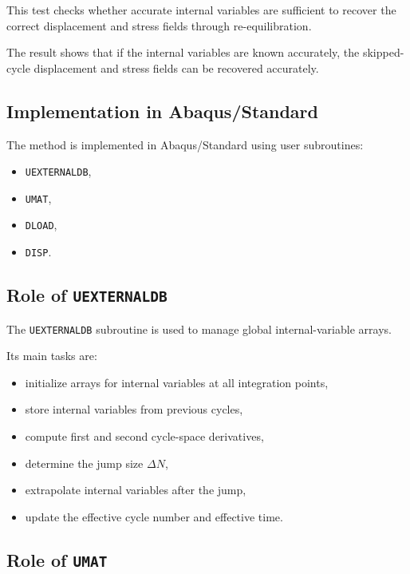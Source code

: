 ﻿\documentclass[11pt,a4paper]{article}
\begin{document}
This test checks whether accurate internal variables are sufficient to recover the correct displacement and stress fields through re-equilibration.

The result shows that if the internal variables are known accurately, the skipped-cycle displacement and stress fields can be recovered accurately.

\subsection{Implementation in Abaqus/Standard}

The method is implemented in Abaqus/Standard using user subroutines:

\begin{itemize}[leftmargin=*]
    \item \texttt{UEXTERNALDB},
    \item \texttt{UMAT},
    \item \texttt{DLOAD},
    \item \texttt{DISP}.
\end{itemize}

\subsection{Role of \texttt{UEXTERNALDB}}

The \texttt{UEXTERNALDB} subroutine is used to manage global internal-variable arrays.

Its main tasks are:

\begin{itemize}[leftmargin=*]
    \item initialize arrays for internal variables at all integration points,
    \item store internal variables from previous cycles,
    \item compute first and second cycle-space derivatives,
    \item determine the jump size $\Delta N$,
    \item extrapolate internal variables after the jump,
    \item update the effective cycle number and effective time.
\end{itemize}

\subsection{Role of \texttt{UMAT}}
\end{document}
